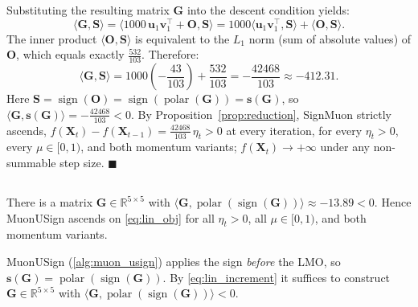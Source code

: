 Substituting the resulting matrix $\mathbf{G}$ into the descent condition yields:
\begin{equation}
\langle \mathbf{G}, \mathbf{S} \rangle = \langle 1000 \, \mathbf{u}_1 \mathbf{v}_1^\top + \mathbf{O}, \mathbf{S} \rangle = 1000 \langle \mathbf{u}_1 \mathbf{v}_1^\top, \mathbf{S} \rangle + \langle \mathbf{O}, \mathbf{S} \rangle.
\end{equation}
The inner product $\langle \mathbf{O}, \mathbf{S} \rangle$ is equivalent to the $L_1$ norm (sum of absolute values) of $\mathbf{O}$, which equals exactly $\frac{532}{103}$. Therefore:
\begin{equation}
\langle \mathbf{G}, \mathbf{S} \rangle = 1000 \left(-\frac{43}{103}\right) + \frac{532}{103} = -\frac{42468}{103} \approx -412.31.
\end{equation}
Here $\mathbf{S}=\operatorname{sign}(\mathbf{O})=\operatorname{sign}(\operatorname{polar}(\mathbf{G}))=\mathbf{s}(\mathbf{G})$, so $\langle \mathbf{G}, \mathbf{s}(\mathbf{G}) \rangle=-\tfrac{42468}{103}<0$. By Proposition~\ref{prop:reduction}, SignMuon strictly ascends, $f(\mathbf{X}_{t})-f(\mathbf{X}_{t-1})=\tfrac{42468}{103}\,\eta_t>0$ at every iteration, for every $\eta_t>0$, every $\mu\in[0,1)$, and both momentum variants; $f(\mathbf{X}_t)\to+\infty$ under any non-summable step size. $\blacksquare$

\subsection{}\label{app:proof_th2}
\begin{theorem}\label{th:2}
There is a matrix $\mathbf{G}\in\mathbb{R}^{5\times5}$ with $\bigl\langle \mathbf{G},\operatorname{polar}(\operatorname{sign}(\mathbf{G}))\bigr\rangle\approx-13.89<0$. Hence MuonUSign ascends on \eqref{eq:lin_obj} for all $\eta_t>0$, all $\mu\in[0,1)$, and both momentum variants.
\end{theorem}

MuonUSign (\cref{alg:muon_usign}) applies the sign \emph{before} the LMO, so $\mathbf{s}(\mathbf{G})=\operatorname{polar}(\operatorname{sign}(\mathbf{G}))$. By \eqref{eq:lin_increment} it suffices to construct $\mathbf{G}\in\mathbb{R}^{5\times5}$ with $\langle\mathbf{G},\operatorname{polar}(\operatorname{sign}(\mathbf{G}))\rangle<0$.

